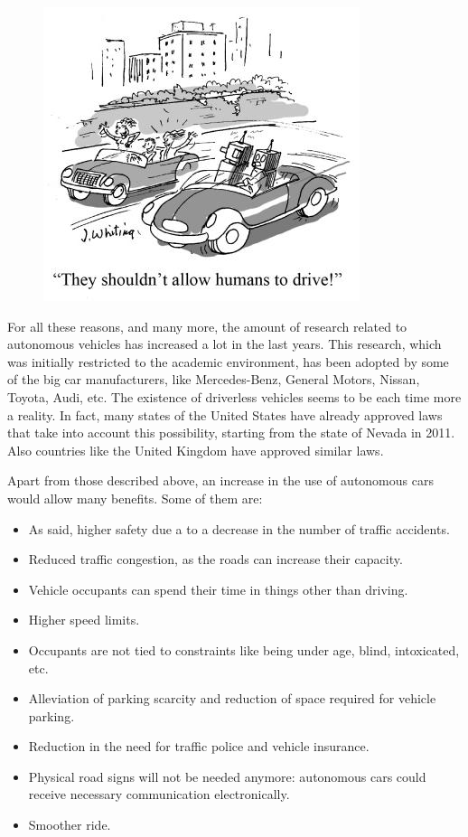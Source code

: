 \begin{figure}
  \centering
  \includegraphics{CarCartoon}
\end{figure}

For all these reasons, and many more, the amount of research related to autonomous vehicles has increased a lot in the last years. This research, which was initially restricted to the academic environment, has been adopted by some of the big car manufacturers, like Mercedes-Benz, General Motors, Nissan, Toyota, Audi, etc. The existence of driverless vehicles seems to be each time more a reality. In fact, many states of the United States have already approved laws that take into account this possibility, starting from the state of Nevada in 2011. Also countries like the United Kingdom have approved similar laws.

Apart from those described above, an increase in the use of autonomous cars would allow many benefits. Some of them are:
\begin{itemize}
 \item As said, higher safety due a to a decrease in the number of traffic accidents.
 \item Reduced traffic congestion, as the roads can increase their capacity.
 \item Vehicle occupants can spend their time in things other than driving.
 \item Higher speed limits.
 \item Occupants are not tied to constraints like being under age, blind, intoxicated, etc.
 \item Alleviation of parking scarcity and reduction of space required for vehicle parking.
 \item Reduction in the need for traffic police and vehicle insurance.
 \item Physical road signs will not be needed anymore: autonomous cars could receive necessary communication electronically.
 \item Smoother ride.
\end{itemize}

